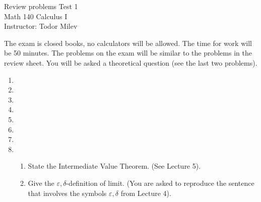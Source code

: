 \documentclass{article}
\begin{document}
\begin{center}
\Large
Review problems Test 1\\ Math 140 Calculus I \\ \normalsize Instructor: Todor Milev
\end{center}


\noindent The exam is closed books, no calculators will be allowed. The time for work will be 50 minutes. The problems on the exam will be similar to the problems in the review sheet. You will be asked a theoretical question (see the last two problems).

\begin{enumerate}
\item 
\item 
\item 
\item 

\item 
\item 
\item 
\item 
\begin{enumerate}
\item State the Intermediate Value Theorem. (See Lecture 5).
\item Give the $\varepsilon,\delta$-definition of limit. (You are asked to reproduce the sentence that involves the symbols $\varepsilon,\delta$ from Lecture 4).
\end{enumerate}
\end{enumerate}
\end{document}
